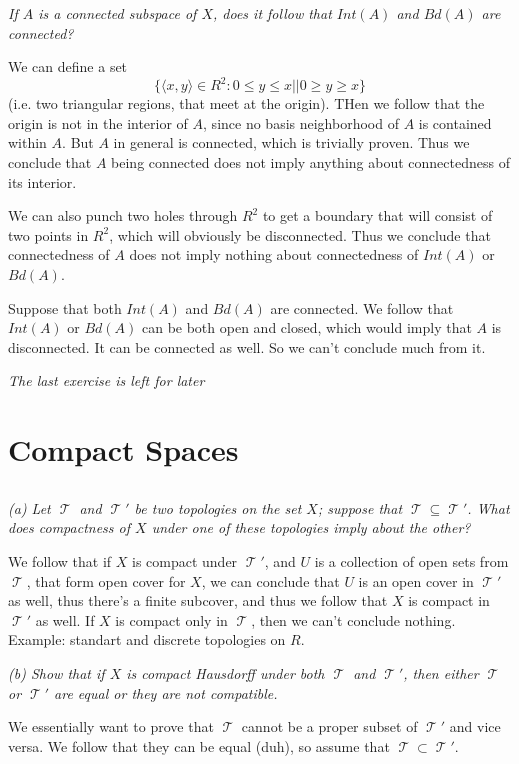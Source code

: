 \documentclass[11pt,oneside,titlepage]{book}
\DeclareMathOperator \topol {\mathcal {T}}
\newcommand{\eangle}[1]{\langle #1 \rangle}
\newcommand{\set}[1]{\{ #1 \}}
\begin{document}
\textit{If $A$ is a connected subspace of $X$, does it follow that $Int(A)$ and $Bd(A)$ are
  connected?}

We can define a set
$$\set{\eangle{x, y} \in R^2: 0 \leq y \leq x || 0 \geq y \geq x}$$
(i.e. two triangular regions, that meet at the origin).
THen we follow that the origin is not in the interior of $A$, since no basis neighborhood
of $A$ is contained within $A$. But $A$ in general is connected, which is trivially
proven. Thus we conclude that $A$ being connected does not imply anything about connectedness
of its interior.

We can also punch two holes through $R^2$ to get a boundary that will consist of two points in
$R^2$, which will obviously be disconnected.  Thus we conclude that
connectedness of $A$ does not imply nothing about connectedness of $Int(A)$ or $Bd(A)$.

Suppose that both $Int(A)$ and $Bd(A)$ are connected. We follow that $Int(A)$ or $Bd(A)$ can
be both open and closed, which would imply that $A$ is disconnected. It can be connected as well.
So we can't conclude much from it.

\textit{The last exercise is left for later}

\section{Compact Spaces}

\subsection{}

\textit{(a) Let $\topol$ and $\topol'$ be two topologies on the set $X$; suppose that
  $\topol \subseteq \topol'$. What does compactness of $X$ under one of these topologies
  imply about the other?}

We follow that if $X$ is compact under $\topol'$, and $U$ is a collection of
open sets from $\topol$, that form open cover for $X$, we can conclude that $U$
is an open cover in $\topol'$ as well, thus there's a finite subcover, and thus we
follow that $X$ is compact in $\topol'$ as well. If $X$ is compact only in $\topol$, then we
can't conclude nothing. Example: standart and discrete topologies on $R$.

\textit{(b) Show that if $X$ is compact Hausdorff under both $\topol$ and $\topol'$, then either
  $\topol$ or $\topol'$ are equal or they are not compatible.}

We essentially want to prove that $\topol$ cannot be a proper subset of $\topol'$ and
vice versa. We follow that they can be equal (duh), so assume that $\topol \subset \topol'$.
\end{document}
